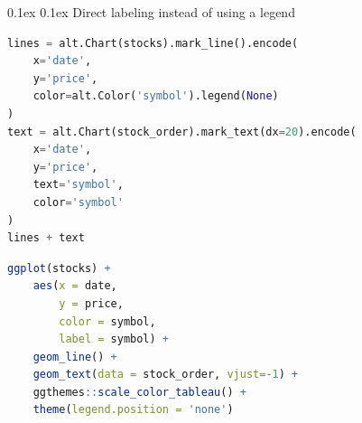 \documentclass[8pt,landscape]{article}
\makeatletter
\renewcommand{\subsection}{\@startsection{subsection}{2}{0pt}%
    {0.1ex}%
    {0.1ex}%
    {\fontsize{8}{9}\bfseries\color{blue}}} %
\makeatother
\begin{document}
\begin{multicols}{3}
\subsection{Direct labeling instead of using a legend}
\begin{lstlisting}[language=Python]
lines = alt.Chart(stocks).mark_line().encode(
    x='date',
    y='price',
    color=alt.Color('symbol').legend(None)
)
text = alt.Chart(stock_order).mark_text(dx=20).encode(
    x='date',
    y='price',
    text='symbol',
    color='symbol'
)
lines + text
\end{lstlisting}
\begin{lstlisting}[language=R]
ggplot(stocks) + 
    aes(x = date,
        y = price,
        color = symbol,
        label = symbol) +
    geom_line() +
    geom_text(data = stock_order, vjust=-1) +
    ggthemes::scale_color_tableau() +
    theme(legend.position = 'none')
\end{lstlisting}
\end{multicols}
\end{document}
